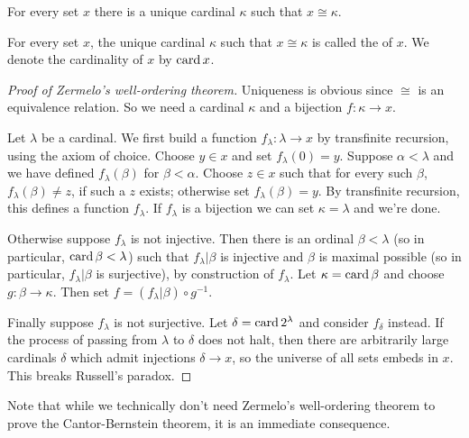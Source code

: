 \begin{theorem}\label{well-ordering theorem}
For every set $x$ there is a unique cardinal $\kappa$ such that $x \cong \kappa$.
\end{theorem}

\begin{definition}
For every set $x$, the unique cardinal $\kappa$ such that $x \cong \kappa$ is called the  of $x$.
We denote the cardinality of $x$ by $\operatorname{card} x$.
\end{definition}

\begin{proof}[Proof of Zermelo's well-ordering theorem]
Uniqueness is obvious since $\cong$ is an equivalence relation.
So we need a cardinal $\kappa$ and a bijection $f: \kappa \to x$.

Let $\lambda$ be a cardinal. We first build a function $f_{\lambda}: \lambda \to x$ by transfinite recursion, using the axiom of choice.
Choose $y \in x$ and set $f_{\lambda}(0) = y$.
Suppose $\alpha < \lambda$ and we have defined $f_{\lambda}(\beta)$ for $\beta < \alpha$.
Choose $z \in x$ such that for every such $\beta$, $f_{\lambda}(\beta) \neq z$, if such a $z$ exists; otherwise set $f_{\lambda}(\beta) = y$.
By transfinite recursion, this defines a function $f_{\lambda}$. If $f_{\lambda}$ is a bijection we can set $\kappa = \lambda$ and we're done.

Otherwise suppose $f_{\lambda}$ is not injective. Then there is an ordinal $\beta < \lambda$ (so in particular, $\operatorname{card} \beta < \lambda$) such that $f_{\lambda}|\beta$ is injective and $\beta$ is maximal possible (so in particular, $f_{\lambda}|\beta$ is surjective), by construction of $f_{\lambda}$.
Let $\kappa = \operatorname{card} \beta$ and choose $g: \beta \to \kappa$.
Then set $f = (f_{\lambda}|\beta) \circ g^{-1}$.

Finally suppose $f_{\lambda}$ is not surjective. Let $\delta = \operatorname{card} 2^{\lambda}$ and consider $f_{\delta}$ instead.
If the process of passing from $\lambda$ to $\delta$ does not halt, then there are arbitrarily large cardinals $\delta$ which admit injections $\delta \to x$, so the universe of all sets embeds in $x$.
This breaks Russell's paradox.
\end{proof}

\begin{subsec}
Note that while we technically don't need Zermelo's well-ordering theorem to prove the Cantor-Bernstein theorem, it is an immediate consequence.
\end{subsec}

